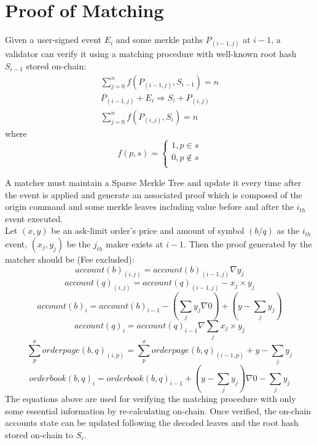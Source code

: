 \documentclass[a4paper,12pt]{article}
\begin{document}
\section{Proof of Matching}
\label{sec:org48d64ef}
Given a user-signed event \(E_{i}\) and some merkle paths \(P_{(i-1, j)}\) at \(i-1\), a validator can verify it using a matching procedure with well-known root hash \(S_{i-1}\) stored on-chain:\\
\begin{eqnarray*}
\sum\limits_{j=0}^{n} f(P_{(i-1, j)}, S_{i-1}) = n\\
P_{(i-1, j)} + E_{i} \Rightarrow S_{i} + P_{(i, j)} \\
\sum\limits_{j=0}^{n} f(P_{(i, j)}, S_{i}) = n
\end{eqnarray*}
where
$$
  f(p, s) =
  \begin{cases}
    1, p \in s\\
    0, p \notin s\\
  \end{cases}
$$

A matcher must maintain a Sparse Merkle Tree and update it every time after the event is applied and generate an associated proof which is composed of the origin command and some merkle leaves including value before and after the \(i_{th}\) event executed.\\
Let \((x, y)\) be an ask-limit order's price and amount of symbol \((b/q)\) as the \(i_{th}\) event, \((x_{j}, y_{j})\) be the \(j_{th}\) maker exists at \(i-1\). Then the proof generated by the matcher should be (Fee excluded):\\
\begin{equation*}
    account(b)_{(i, j)}=account(b)_{(i-1,j)} \nabla y_{j}
\end{equation*}
\begin{equation*}
    account(q)_{(i, j)}=account(q)_{(i-1,j)} - x_{j} \times y_{j}
\end{equation*}
\begin{equation*}
    account(b)_{i}=account(b)_{i-1} - (\sum\limits_{j} y_{j} \nabla 0) + (y - \sum\limits_{j} y_{j})
\end{equation*}
\begin{equation*}
    account(q)_{i}=account(q)_{i-1} \nabla \sum\limits_{j} x_{j} \times y_{j}
\end{equation*}
\begin{equation*}
    \sum\limits_{p}^{x} orderpage(b,q)_{(i, p)} = \sum\limits_{p}^{x} orderpage(b,q)_{(i-1, p)} + y - \sum\limits_{j} y_{j}
\end{equation*}
\begin{equation*}
    orderbook(b,q)_{i}=orderbook(b,q)_{i-1} + (y - \sum\limits_{j} y_{j}) \nabla 0 - \sum\limits_{j} y_{j}
\end{equation*}
The equations above are used for verifying the matching procedure with only some essential information by re-calculating on-chain. Once verified, the on-chain accounts state can be updated following the decoded leaves and the root hash stored on-chain to \(S_{i}\).\\
\end{document}
